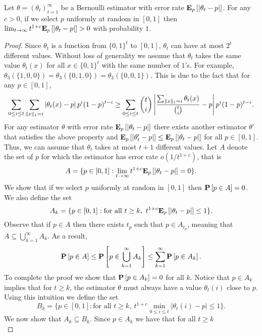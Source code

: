 \begin{lemma}\label{l:estimation_lower_bound}
  Let $\theta=(\theta_t)_{t=1}^\infty$ be a Bernoulli estimator
  with error rate $\Expnew{p}{|\theta_t  - p |}$.
  For any $c>0$, if we select $p$ uniformly at random in $[0,1]$ then
   \(\lim_{t\to \infty} t^{1+c} \Expnew{p}{|\theta_t  - p |} > 0\) with
   probability $1$.
\end{lemma}
\begin{proof}
Since $\theta_t$ is a function from $\{0,1\}^t$ to $[0,1]$, $\theta_t$ can have at most
  $2^t$ different values. Without loss of generality we assume that
  $\theta_t$ takes the same value $\theta_t(x)$ for all $x \in \{0,1\}^t$
  with the same number of $1$'s. For example,
  $\theta_3(\{1,0,0\})=\theta_3(\{0,1,0\})=\theta_3(\{0,0,1\})$.
  This is due to the fact that for any $p \in[0,1]$,
  \[
    \sum_{0 \leq i \leq t} \sum_{\norm{1}{x} = i} \lp| \theta_t(x) - p \rp|
    p^i (1-p)^{t-i} \geq \sum_{0 \leq i \leq t} \binom{t}{i} \lp|
    \frac{\sum_{\norm{1}{x} = i} \theta_t(x)}{\binom{t}{i}}  - p \rp| p^i
    (1-p)^{t-i}.
  \]
  For any estimator $\theta$ with error rate $\Expnew{p}{|\theta_t  - p |}$ there exists another
  estimator $\theta'$ that satisfies the above property and
  $\Expnew{p}{|\theta_t'  - p |} \leq \Expnew{p}{|\theta_t  - p |}$ for all $p \in [0,1]$.
  Thus, we can assume that $\theta_t$ takes at most $t+1$ different
  values.
  Let $A$ denote the set of $p$ for which the estimator has error
  rate $o(1/t^{1+c})$, that is
  \[
    A= \{p\in [0,1]: \lim_{t \to \infty} t^{1+c}\Expnew{p}{|\theta_t  - p |}=0\}.
  \]
  We show that if we select $p$ uniformly at random in $[0,1]$ then
  $\Prob{p \in A} = 0$.  We also define the set
  \[
    A_k=\{p\in [0,1]: \text{for all }t \geq k,~
    t^{1+c}\Expnew{p}{|\theta_t  - p |}\leq 1\}.
  \]
  Observe that if $p \in A$ then there exists $t_p$ such that
  $p \in A_{t_p}$, meaning that
  $A \subseteq \bigcup_{k=1}^{\infty}A_k$.  As a result,
  \[
    \Prob{p \in A} \leq \Prob {p \in\bigcup_{k=1}^{\infty}A_k} \leq
    \sum_{k=1}^{\infty}\Prob{p \in A_k}.
  \]
  To complete the proof we show that $\Prob{p \in A_k}=0$ for all $k$.
  Notice that $p \in A_k$ implies that for $t \geq k$, the estimator
  $\theta$ must always have a value $\theta_t(i)$ close to $p$.
  Using this intuition we define the set
  \[
    B_k = \{p \in [0,1]: \text{for all
    }t\geq k,~ t^{1+c}\min_{0\leq i \leq t}|\theta_t(i)-p| \leq 1\}.
  \]
  We now show that $A_k \subseteq B_k$.
  Since $p \in A_k$ we have that for all $t\geq k$
  \[
\]
\end{proof}
